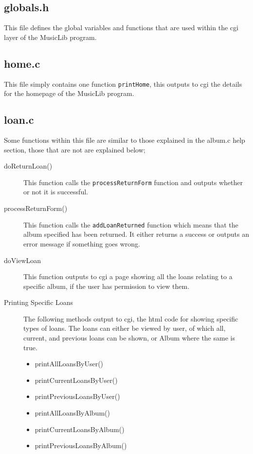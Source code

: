 \documentclass{article}
\begin{document}
\subsection{globals.h}
This file defines the global variables and functions that are used within the cgi layer of the MusicLib program.

\subsection{home.c}
This file simply contains one function \verb|printHome|, this outputs to cgi the details for the homepage of the MusicLib program.

\subsection{loan.c}
Some functions within this file are similar to those explained in the album.c help section, those that are not are explained below;
\begin{description}
\item[doReturnLoan()] This function calls the \verb|processReturnForm| function and outputs whether or not it is successful.
\item[processReturnForm()] This function calls the \verb|addLoanReturned| function which means that the album specified has been returned. It either returns a success or outputs an error message if something goes wrong.
\item[doViewLoan] This function outputs to cgi a page showing all the loans relating to a specific album, if the user has permission to view them.

\item[Printing Specific Loans] The following methods output to cgi, the html code for showing specific types of loans. The loans can either be viewed by user, of which all, current, and previous loans can be shown, or Album where the same is true.
\begin{itemize}
\item{printAllLoansByUser()}
\item{printCurrentLoansByUser()}
\item{printPreviousLoansByUser()}
\item{printAllLoansByAlbum()}
\item{printCurrentLoansByAlbum()}
\item{printPreviousLoansByAlbum()}
\end{itemize}
\end{description}
\end{document}
